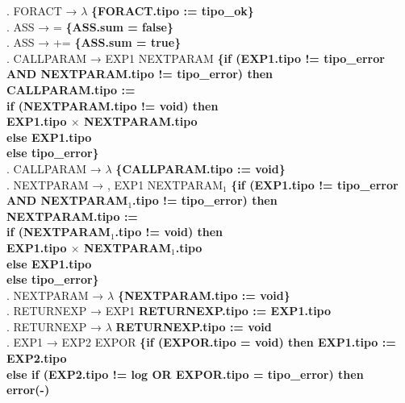\begin{tabbing}
    . FORACT → $\lambda$ \textbf{\{FORACT.tipo := tipo\_ok\}}\\
    . ASS → = \textbf{\{ASS.sum = false\}}\\
    . ASS → += \textbf{\{ASS.sum = true\}}\\
    . CALLPARAM → EXP1 NEXTPARAM \textbf{\{if (EXP1.tipo != tipo\_error}\\
    \>                    \> \textbf{AND NEXTPARAM.tipo != tipo\_error) then}\\
    \>                    \> \> \textbf{CALLPARAM.tipo :=}\\
    \>                    \> \> \> \textbf{if (NEXTPARAM.tipo != void) then}\\
    \>                    \> \> \> \textbf{  EXP1.tipo $\times$ NEXTPARAM.tipo}\\
    \>                    \> \> \> \textbf{else EXP1.tipo}\\
    \>                    \> \textbf{else tipo\_error\}}\\ 
    . CALLPARAM → $\lambda$ \textbf{\{CALLPARAM.tipo := void\}}\\
    . NEXTPARAM → , EXP1 NEXTPARAM$_1$ \textbf{\{if (EXP1.tipo != tipo\_error}\\
    \>                    \> \textbf{AND NEXTPARAM$_1$.tipo != tipo\_error) then}\\
    \>                    \> \> \textbf{NEXTPARAM.tipo :=}\\
    \>                    \> \> \> \textbf{if (NEXTPARAM$_1$.tipo != void) then}\\
    \>                    \> \> \> \textbf{  EXP1.tipo $\times$ NEXTPARAM$_1$.tipo}\\
    \>                    \> \> \> \textbf{else EXP1.tipo}\\
    \>                    \> \textbf{else tipo\_error\}}\\ 
    . NEXTPARAM → $\lambda$ \textbf{\{NEXTPARAM.tipo := void\}}\\
    . RETURNEXP → EXP1 \textbf{RETURNEXP.tipo := EXP1.tipo}\\
    . RETURNEXP → $\lambda$ \textbf{RETURNEXP.tipo := void}\\
    . EXP1 → EXP2 EXPOR \>\textbf{\{if (EXPOR.tipo = void) then EXP1.tipo := EXP2.tipo}\\
    \>                     \> \textbf{else if (EXP2.tipo != log OR EXPOR.tipo = tipo\_error) then}\\
    \>                     \> \> \textbf{error(-)}\\

\end{tabbing}
